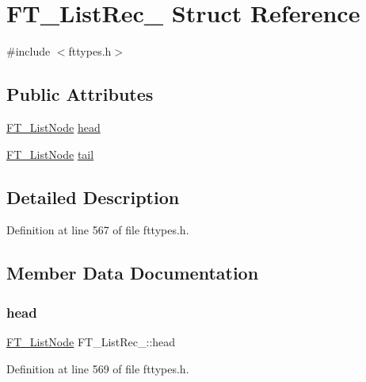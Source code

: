 \hypertarget{struct_f_t___list_rec__}{}\section{F\+T\+\_\+\+List\+Rec\+\_\+ Struct Reference}
\label{struct_f_t___list_rec__}


{\ttfamily \#include $<$fttypes.\+h$>$}

\subsection*{Public Attributes}
\begin{DoxyCompactItemize}
\item 
\mbox{\hyperlink{fttypes_8h_a155e4980a42c16fbc221ad40b2b59695}{F\+T\+\_\+\+List\+Node}} \mbox{\hyperlink{struct_f_t___list_rec___a09ed35c2bcdc1c3acd12ff4650dfdeb9}{head}}
\item 
\mbox{\hyperlink{fttypes_8h_a155e4980a42c16fbc221ad40b2b59695}{F\+T\+\_\+\+List\+Node}} \mbox{\hyperlink{struct_f_t___list_rec___a4664761f0ab2af3d48231b00cd978b23}{tail}}
\end{DoxyCompactItemize}


\subsection{Detailed Description}


Definition at line 567 of file fttypes.\+h.



\subsection{Member Data Documentation}
\mbox{\label{struct_f_t___list_rec___a09ed35c2bcdc1c3acd12ff4650dfdeb9}} 
\subsubsection{\texorpdfstring{head}{head}}
{\footnotesize\ttfamily \mbox{\hyperlink{fttypes_8h_a155e4980a42c16fbc221ad40b2b59695}{F\+T\+\_\+\+List\+Node}} F\+T\+\_\+\+List\+Rec\+\_\+\+::head}



Definition at line 569 of file fttypes.\+h.

\mbox{\label{struct_f_t___list_rec___a4664761f0ab2af3d48231b00cd978b23}} 

